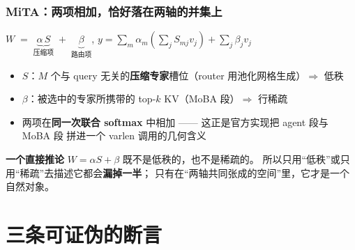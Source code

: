 \documentclass[10pt,aspectratio=169,mathserif]{beamer}
\begin{document}
\begin{frame}
\frametitle{\textbf{MiTA：两项相加，恰好落在两轴的并集上}}
  \begin{center}
    $W \;=\; \underbrace{\alpha\,S}_{\text{压缩项}} \;+\; \underbrace{\beta}_{\text{路由项}}$,
    \qquad
    $y=\sum_{m}\alpha_m\!\left(\sum_j S_{mj}v_j\right)+\sum_j \beta_j v_j$
  \end{center}

  \begin{itemize}
    \small
    \item $S$：$M$ 个与 query 无关的\textbf{压缩专家}槽位（router 用池化网格生成）$\Rightarrow$ 低秩
    \item $\beta$：被选中的专家所携带的 top-$k$ KV（MoBA 段）$\Rightarrow$ 行稀疏
    \item 两项在\textbf{同一次联合 softmax} 中相加 —— 这正是官方实现把 agent 段与 MoBA 段
          拼进一个 varlen 调用的几何含义
  \end{itemize}

  \vspace{0.4em}
  \begin{block}{\textbf{一个直接推论}}
    \small
    $W=\alpha S+\beta$ 既不是低秩的，也不是稀疏的。
    所以只用“低秩”或只用“稀疏”去描述它都会\textbf{漏掉一半}；
    只有在“两轴共同张成的空间”里，它才是一个自然对象。
  \end{block}
\end{frame}

\section[断言]{三条可证伪的断言}
\end{document}

